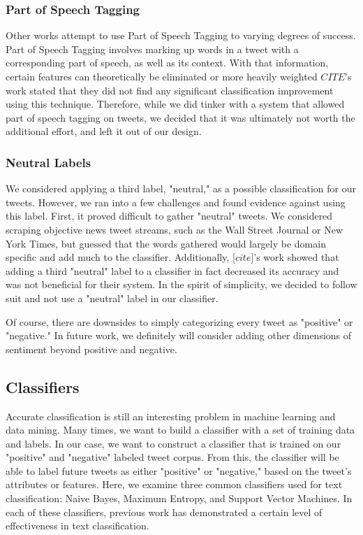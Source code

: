 \documentclass[preprint,pre,floats,aps,amsmath,amssymb,12pt]{revtex4}
\begin{document}
\subsubsection{Part of Speech Tagging}
Other works attempt to use Part of Speech Tagging to varying degrees of success. Part of Speech Tagging involves marking up words in a tweet with a corresponding part of speech, as well as its context. With that information, certain features can theoretically be eliminated or more heavily weighted $CITE$'s work stated that they did not find any significant classification improvement using this technique. Therefore, while we did tinker with a system that allowed part of speech tagging on tweets, we decided that it was ultimately not worth the additional effort, and left it out of our design. 

\subsubsection{Neutral Labels}
We considered applying a third label, "neutral," as a possible classification for our tweets. However, we ran into a few challenges and found evidence against using this label. First, it proved difficult to gather "neutral" tweets. We considered scraping objective news tweet streams, such as the Wall Street Journal or New York Times, but guessed that the words gathered would largely be domain specific and add much to the classifier. Additionally, [$cite$]'s work showed that adding a third "neutral" label to a classifier in fact decreased its accuracy and was not beneficial for their system. In the spirit of simplicity, we decided to follow suit and not use a "neutral" label in our classifier.

Of course, there are downsides to simply categorizing every tweet as "positive" or "negative." In future work, we definitely will consider adding other dimensions of sentiment beyond positive and negative. 

\subsection{Classifiers}
Accurate classification is still an interesting problem in machine learning and data mining. Many times, we want to build a classifier with a set of training data and labels. In our case, we want to construct a classifier that is trained on our "positive" and "negative" labeled tweet corpus. From this, the classifier will be able to label future tweets as either "positive" or "negative," based on the tweet's attributes or features. Here, we examine three common classifiers used for text classification: Naive Bayes, Maximum Entropy, and Support Vector Machines. In each of these classifiers, previous work has demonstrated a certain level of effectiveness in text classification. 
\end{document}
